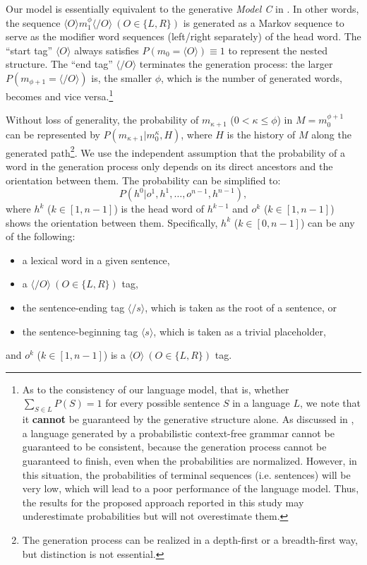\documentclass[english]{jnlp_1.4}
\begin{document}
Our model is essentially equivalent to the generative {\it{Model C}} in \cite{eisner1996}.
In other words, the sequence $\langle O \rangle m_{1}^{\phi} \langle \slash O \rangle\ (O \in \{L, R\}) $ is generated as a Markov sequence to serve as the modifier word sequences (left/right separately) of the head word. The ``start tag'' $\langle O \rangle  $ always satisfies $P (m_0=\langle O \rangle) \equiv 1$ to represent the nested structure.
The ``end tag'' $\langle \slash O \rangle$ terminates the generation process: the larger  $P (m_{\phi+1}=\langle \slash O \rangle)$ is, the smaller $\phi$, which is the number of generated words, becomes and vice versa.\footnote{As to the consistency of our language model, that is, whether $\sum_{S \in L} P(S)=1$ for every possible sentence $S$ in a language $L$, we note that it {\bf cannot} be guaranteed by the generative structure alone. As discussed in \cite{wetherell1980probabilistic}, a language generated by a probabilistic context-free grammar cannot be guaranteed to be consistent, because the generation process cannot be guaranteed to finish, even when the probabilities are normalized. However, in this situation, the probabilities of terminal sequences (i.e. sentences) will be very low, which will lead to a poor performance of the language model. Thus, the results for the proposed approach reported in this study may underestimate probabilities but will not overestimate them.}

Without loss of generality, the probability of $m_{\kappa+1}$ ($ 0 < \kappa \leq \phi$) in $M = m_0^{\phi+1}$ can be represented by 
$P (m_{\kappa+1} | m_{0}^{\kappa}, H)$,
where $H$ is the history of $M$
along the generated path\footnote{The generation process can be realized in a depth-first or a breadth-first way, but distinction is not essential.}.
We use the independent assumption that the probability of a word in the generation process only depends on its direct ancestors and the orientation between them.
The probability can be simplified to: 
\begin{equation}
\label{parameter1}
P (h^0 | o^1, h^1, \dots, o^{n-1}, h^{n-1}),
\end{equation}
where $h^k$ ($k \in [1,n-1]$) is the head word of $h^{k-1}$ and $o^k$ ($k \in [1,n-1]$) shows the orientation between them.
Specifically, $h^k$ ($k \in [0,n-1]$) can be any of the following:
\begin{itemize}
\item a lexical word in a given sentence,
\item a $\langle \slash O \rangle\ (O \in \{L, R\}) $ tag,
\item the sentence-ending tag $\langle \slash s \rangle$, which is taken as the root of a sentence, or
\item the sentence-beginning tag $\langle s \rangle$, which is taken as a trivial placeholder,
\end{itemize}
and $o^k$ ($k \in [1,n-1]$) is a $\langle O \rangle\ (O \in \{L, R\}) $ tag. 
\end{document}
